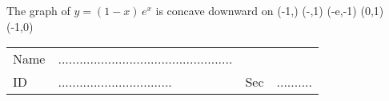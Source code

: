 \documentclass[amsfonts,bezier,leqno,fleqn,12pt,a4paper]{article}
\begin{document}
{{{\begin{large}
\item %
The graph of $y=(1-x)\,e^x$ is concave downward on
\sc
\be
\displaystyle (-1,\infty)
\ee
\be
(-\infty,1)
\ee
\be
(-e,-1)
\ee
\be
(0,1)
\ee
\be
(-1,0)
\ee

\newpage



\en
\end{large}

\newpage


\renewcommand{\thepage}{\noindent Math 101, Final Exam, Term 162 \hfill Answer Sheet  \hfill {\bf \fbox{003}}}

\begin{Large}


\begin{tabular}{llll}
Name & .................................................& & \\
ID &   ................................& Sec & ..........\\
\end{tabular}

\vspace{10mm}



\end{Large}}}}
\end{document}
